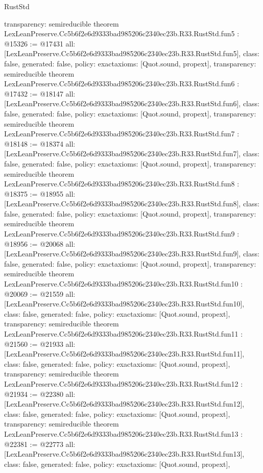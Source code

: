 \begin{lexlean}{RustStd}
\begin{coremodule}
{  transparency: semireducible
}
theorem LexLeanPreserve.Cc5b6f2e6d9333bad985206c2340ec23b.R33.RustStd.fun5 : @15326 := @17431 {
  all: [LexLeanPreserve.Cc5b6f2e6d9333bad985206c2340ec23b.R33.RustStd.fun5],
  class: false,
  generated: false,
  policy: exact{axioms: [Quot.sound, propext]},
  transparency: semireducible
}
theorem LexLeanPreserve.Cc5b6f2e6d9333bad985206c2340ec23b.R33.RustStd.fun6 : @17432 := @18147 {
  all: [LexLeanPreserve.Cc5b6f2e6d9333bad985206c2340ec23b.R33.RustStd.fun6],
  class: false,
  generated: false,
  policy: exact{axioms: [Quot.sound, propext]},
  transparency: semireducible
}
theorem LexLeanPreserve.Cc5b6f2e6d9333bad985206c2340ec23b.R33.RustStd.fun7 : @18148 := @18374 {
  all: [LexLeanPreserve.Cc5b6f2e6d9333bad985206c2340ec23b.R33.RustStd.fun7],
  class: false,
  generated: false,
  policy: exact{axioms: [Quot.sound, propext]},
  transparency: semireducible
}
theorem LexLeanPreserve.Cc5b6f2e6d9333bad985206c2340ec23b.R33.RustStd.fun8 : @18375 := @18955 {
  all: [LexLeanPreserve.Cc5b6f2e6d9333bad985206c2340ec23b.R33.RustStd.fun8],
  class: false,
  generated: false,
  policy: exact{axioms: [Quot.sound, propext]},
  transparency: semireducible
}
theorem LexLeanPreserve.Cc5b6f2e6d9333bad985206c2340ec23b.R33.RustStd.fun9 : @18956 := @20068 {
  all: [LexLeanPreserve.Cc5b6f2e6d9333bad985206c2340ec23b.R33.RustStd.fun9],
  class: false,
  generated: false,
  policy: exact{axioms: [Quot.sound, propext]},
  transparency: semireducible
}
theorem LexLeanPreserve.Cc5b6f2e6d9333bad985206c2340ec23b.R33.RustStd.fun10 : @20069 := @21559 {
  all: [LexLeanPreserve.Cc5b6f2e6d9333bad985206c2340ec23b.R33.RustStd.fun10],
  class: false,
  generated: false,
  policy: exact{axioms: [Quot.sound, propext]},
  transparency: semireducible
}
theorem LexLeanPreserve.Cc5b6f2e6d9333bad985206c2340ec23b.R33.RustStd.fun11 : @21560 := @21933 {
  all: [LexLeanPreserve.Cc5b6f2e6d9333bad985206c2340ec23b.R33.RustStd.fun11],
  class: false,
  generated: false,
  policy: exact{axioms: [Quot.sound, propext]},
  transparency: semireducible
}
theorem LexLeanPreserve.Cc5b6f2e6d9333bad985206c2340ec23b.R33.RustStd.fun12 : @21934 := @22380 {
  all: [LexLeanPreserve.Cc5b6f2e6d9333bad985206c2340ec23b.R33.RustStd.fun12],
  class: false,
  generated: false,
  policy: exact{axioms: [Quot.sound, propext]},
  transparency: semireducible
}
theorem LexLeanPreserve.Cc5b6f2e6d9333bad985206c2340ec23b.R33.RustStd.fun13 : @22381 := @22773 {
  all: [LexLeanPreserve.Cc5b6f2e6d9333bad985206c2340ec23b.R33.RustStd.fun13],
  class: false,
  generated: false,
  policy: exact{axioms: [Quot.sound, propext]},
}
\end{coremodule}
\end{lexlean}
